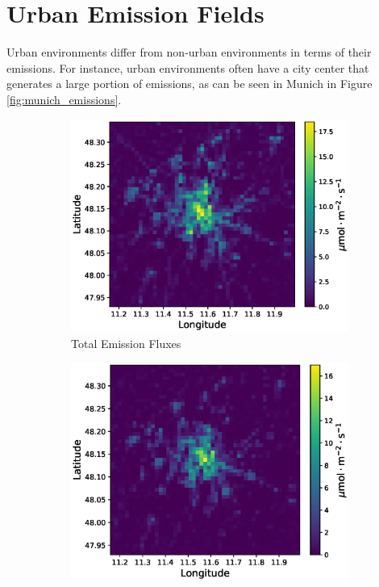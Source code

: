 \section{Urban Emission Fields}
Urban environments differ from non-urban environments in terms of their emissions.
For instance, urban environments often have a city center that generates a large portion of emissions, as can be seen in Munich in Figure \ref{fig:munich_emissions}.
\begin{figure}
    \centering
    \begin{subfigure}{0.32\textwidth}
        \centering
        \includegraphics[width=\linewidth]{figures/03_dataset/munich/munich_2015_total_emissions.eps}
        \caption{Total Emission Fluxes}
    \end{subfigure}
    \begin{subfigure}{0.32\textwidth}
        \centering
        \includegraphics[width=\linewidth]{figures/03_dataset/munich/munich_2015_sector_c.eps}

\end{subfigure}
\end{figure}
